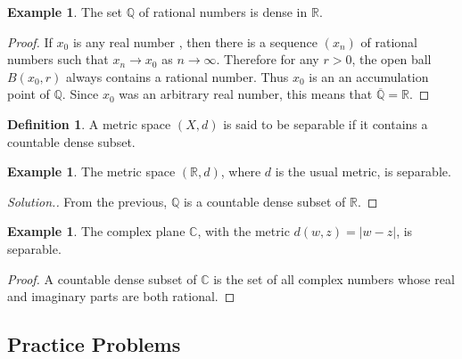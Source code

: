 \documentclass[11pt,a4paper]{article}
\theoremstyle{definition}
\newtheorem{defn}[thm]{Definition}
\newtheorem{exa}[thm]{Example}
\newenvironment{solution}
  {\renewcommand{\qedsymbol}{}\begin{proof}[\textit{Solution}.]}
  {\end{proof}}
\begin{document}
\begin{exa}
The set $\mathbb{Q}$ of rational numbers is dense in $\mathbb{R}$.
\end{exa}

\begin{proof}
If $x_0$ is any real number , then there is a sequence $(x_n)$ of rational numbers such that $x_n\rightarrow x_0$ as $n\rightarrow \infty$. Therefore for any $r>0$, the open ball $B(x_0,r)$ always contains a rational number. Thus $x_0$ is an an accumulation point of $\mathbb{Q}$. Since $x_0$ was an arbitrary real number, this means that $\overline{\mathbb{Q}}=\mathbb{R}$.
\end{proof}

\begin{defn}
A metric space $(X,d)$ is said to be separable if it contains a countable dense subset.
\end{defn}


\begin{exa}
The metric space $(\mathbb{R},d)$, where $d$ is the usual metric, is separable.
\end{exa}

\begin{solution}
From the previous, $\mathbb{Q}$ is a countable dense subset of $\mathbb{R}$.
\end{solution}

\begin{exa}
The complex plane $\mathbb{C}$, with the metric $d(w,z)=|w-z|$, is separable.
\end{exa}

\begin{proof}
A countable dense subset of $\mathbb{C}$ is the set of all complex numbers whose real and imaginary parts are both rational.
\end{proof}







\subsection{Practice Problems}
\end{document}
